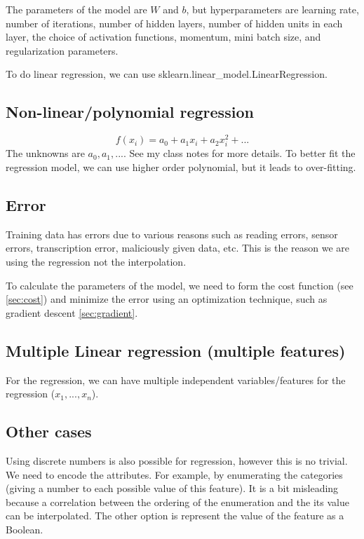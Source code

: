 \documentclass[12pt]{report}
\begin{document}
The parameters of the model are $W $ and $b$, but hyperparameters are learning rate, number of iterations, number of hidden layers, number of hidden units in each layer, the choice of activation functions, momentum, mini batch size, and regularization parameters.

To do linear regression, we can use sklearn.linear\_model.LinearRegression.

\subsection{Non-linear/polynomial regression}
\begin{equation}
	f(x_i) = a_0 + a_1 x_i + a_2 x_i^2 + ...
\end{equation}
The unknowns are $a_0, a_1, ...$.
See my class notes for more details.
To better fit the regression model, we can use higher order polynomial, but it leads to over-fitting.


\subsection{Error}
Training data has errors due to various reasons such as reading errors, sensor errors, transcription error, maliciously given data, etc. This is the reason we are using the regression not the interpolation.

To calculate the parameters of the model, we need to form the cost function (see \ref{sec:cost}) and minimize the error using an optimization technique, such as gradient descent \ref{sec:gradient}.

\subsection{Multiple Linear regression (multiple features)}

For the regression, we can have multiple independent variables/features for the regression ($x_1, ..., x_n$).




\subsection{Other cases}
Using discrete numbers is also possible for regression, however this is no trivial. We need to encode the attributes. For example, by enumerating the categories (giving a number to each possible value of this feature). It is a bit misleading because a correlation between the ordering of the
enumeration and the its value can be interpolated. The other option is represent the value of the feature as a Boolean.
\end{document}
